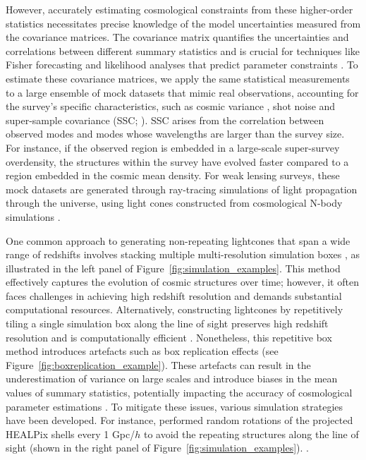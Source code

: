 However, accurately estimating cosmological constraints from these higher-order statistics necessitates precise knowledge of the model uncertainties measured from the covariance matrices. The covariance matrix quantifies the uncertainties and correlations between different summary statistics and is crucial for techniques like Fisher forecasting and likelihood analyses that predict parameter constraints \citep{1997PhRvL..79.3806T}. To estimate these covariance matrices, we apply the same statistical measurements to a large ensemble of mock datasets that mimic real observations, accounting for the survey's specific characteristics, such as cosmic variance \citep{PhysRevLett.102.021302}, shot noise \citep{2019MNRAS.490.2606W} and super-sample covariance (SSC; \citealt{PhysRevD.87.123504}). SSC arises from the correlation between observed modes and modes whose wavelengths are larger than the survey size. For instance, if the observed region is embedded in a large-scale super-survey overdensity, the structures within the survey have evolved faster compared to a region embedded in the cosmic mean density. For weak lensing surveys, these mock datasets are generated through ray-tracing simulations of light propagation through the universe, using light cones constructed from cosmological N-body simulations \citep{2019MNRAS.486...52S, 2024arXiv240513495E}.

One common approach to generating non-repeating lightcones that span a wide range of redshifts involves stacking multiple multi-resolution simulation boxes \citep{Sato_2009, 2015MNRAS.448.2987F, 2015MNRAS.453.1513C, 2017ApJ...850...24T, 2019ApJ...875...69D}, as illustrated in the left panel of Figure~\ref{fig:simulation_examples}. This method effectively captures the evolution of cosmic structures over time; however, it often faces challenges in achieving high redshift resolution and demands substantial computational resources. Alternatively, constructing lightcones by repetitively tiling a single simulation box along the line of sight preserves high redshift resolution and is computationally efficient \citep{2010ApJ...709..920S, 2018JCAP...03..049L, 2020JCAP...10..012S, 2024MNRAS.530.5030O}. Nonetheless, this repetitive box method introduces artefacts such as box replication effects \citep{2024MNRAS.534.1205C} (see Figure~\ref{fig:boxreplication_example}). These artefacts can result in the underestimation of variance on large scales and introduce biases in the mean values of summary statistics, potentially impacting the accuracy of cosmological parameter estimations \citep{2021JCAP...01..028Z}. To mitigate these issues, various simulation strategies have been developed. For instance, \citet{2024MNRAS.530.5030O} performed random rotations of the projected HEALPix shells every 1 Gpc/$h$ to avoid the repeating structures along the line of sight (shown in the right panel of Figure~\ref{fig:simulation_examples}). .


